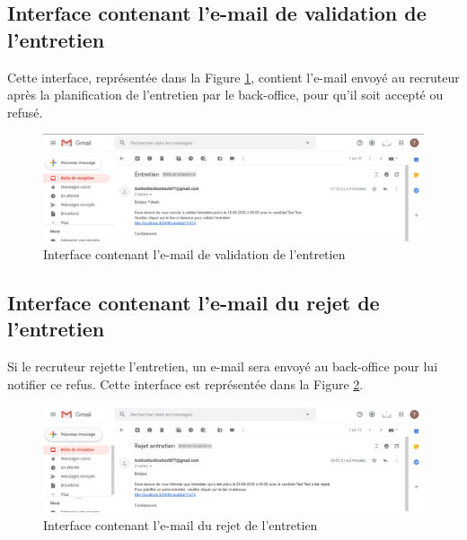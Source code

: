 \subsection{Interface contenant l'e-mail de validation de l'entretien}
Cette interface, représentée dans la Figure \ref{fig:capture_email_validation}, contient l'e-mail envoyé au recruteur après la planification de l'entretien par le back-office, pour qu'il soit accepté ou refusé.
\begin{figure}[H]
     \centering
     \includegraphics[scale=0.5]{img/capture mail de validation.PNG}
     \caption{Interface contenant l'e-mail de validation de l'entretien}
     \label{fig:capture_email_validation}
 \end{figure}
 \subsection{Interface contenant l'e-mail du rejet de l'entretien }
 Si le recruteur rejette l'entretien, un e-mail sera envoyé au back-office pour lui notifier ce refus. Cette interface est représentée dans la Figure \ref{fig:capture_email_rejet}.
 \begin{figure}[H]
     \centering
     \includegraphics[scale=0.5]{img/capture mail rejet entretien.PNG}
     \caption{Interface contenant l'e-mail du rejet de l'entretien}
     \label{fig:capture_email_rejet}
 \end{figure}
